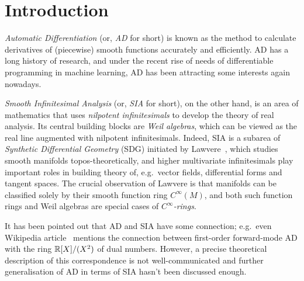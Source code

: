 \documentclass[%
  sigconf,authorversion,screen]{acmart}
\begin{document}
  

\maketitle

\section{Introduction}\label{sec:intro}
\sloppy
\emph{Automatic Differentiation} (or, \emph{AD} for short) is known as the method to calculate derivatives of (piecewise) smooth functions accurately and efficiently.
AD has a long history of research, and under the recent rise of needs of differentiable programming in machine learning, AD has been attracting some interests again nowadays.

\emph{Smooth Infinitesimal Analysis} (or, \emph{SIA} for short), on the other hand, is an area of mathematics that uses \emph{nilpotent infinitesimals} to develop the theory of real analysis.
Its central building blocks are \emph{Weil algebras}, which can be viewed as the real line augmented with nilpotent infinitesimals.
Indeed, SIA is a subarea of \emph{Synthetic Differential Geometry} (SDG) initiated by Lawvere~\cite{lawvere1979categorical}, which studies smooth manifolds topos-theoretically, and higher multivariate infinitesimals play important roles in building theory of, e.g.\ vector fields, differential forms and tangent spaces.
The crucial observation of Lawvere is that manifolds can be classified solely by their smooth function ring $C^\infty(M)$, and both such function rings and Weil algebras are special cases of \emph{$C^\infty$-rings}.

It has been pointed out that AD and SIA have some connection; e.g.\ even Wikipedia article~\cite{Wikipedia:2021aa} mentions the connection between first-order forward-mode AD with the ring $\mathbb{R}[X]/(X^2)$ of dual numbers.
However, a precise theoretical description of this correspondence is not well-communicated and further generalisation of AD in terms of SIA hasn't been discussed enough.
\end{document}
